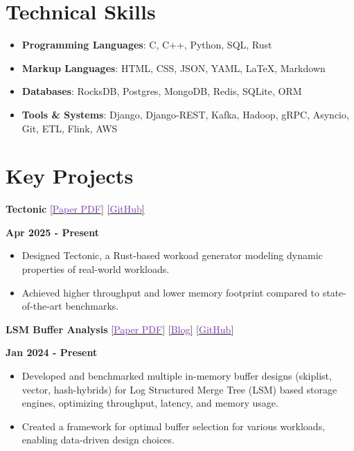 \documentclass[11pt,a4paper,calibri]{moderncv}
\begin{document}
\vspace{-0.7em}
\section{Technical Skills}
\vspace{-0.3em}
\begin{itemize}[topsep=0pt, itemsep=0pt, parsep=0.2em]
	\item \textbf{Programming Languages}: C, C++, Python, SQL, Rust
	\item \textbf{Markup Languages}: HTML, CSS, JSON, YAML, \LaTeX, Markdown
	\item \textbf{Databases}: RocksDB, Postgres, MongoDB, Redis, SQLite, ORM
	\item \textbf{Tools \& Systems}: Django, Django-REST, Kafka, Hadoop, gRPC, Asyncio, Git, ETL, Flink, AWS
\end{itemize}

\vspace{-0.9em}
\section{Key Projects}
\vspace{-0.3em}
\textbf{Tectonic} \href{https://shubhamkaushik.com/projects/assets/pdf/Tectonic.pdf}{[\textcolor{blueviolet}{Paper PDF}]} \href{https://github.com/SSD-Brandeis/tectonic}{[\textcolor{blueviolet}{GitHub}]} \hfill \raggedright{\textbf{Apr 2025 - Present}}
\begin{itemize}[left=4pt, topsep=0pt, itemsep=0pt, parsep=0.5pt]
    \item Designed Tectonic, a Rust-based workoad generator modeling dynamic properties of real-world workloads.
    \item Achieved \underbar{$2\times$} higher throughput and  lower memory footprint compared to state-of-the-art benchmarks.
\end{itemize}

\mediumspace{}

\textbf{LSM Buffer Analysis} \href{https://shubhamkaushik.com/assets/pdf/LSMMemory.pdf}{[\textcolor{blueviolet}{Paper PDF}]} \href{https://shubhamkaushik.com/projects/lsm_memory_buffer/}{[\textcolor{blueviolet}{Blog}]} \href{https://github.com/SSD-Brandeis/LSMMemoryProfiling}{[\textcolor{blueviolet}{GitHub}]} \hfill \raggedright{\textbf{Jan 2024 - Present}}
\begin{itemize}[left=4pt, topsep=0pt, itemsep=0pt, parsep=0.5pt]
    \item Developed and benchmarked multiple in-memory buffer designs (skiplist, vector, hash-hybrids) for Log Structured Merge Tree (LSM) based storage engines, optimizing throughput, latency, and memory usage.
    \item Created a framework for optimal buffer selection for various workloads, enabling data-driven design choices.
\end{itemize}
\end{document}
